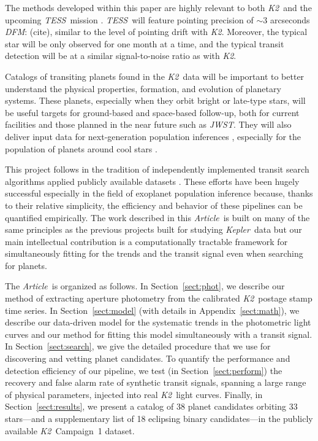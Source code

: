\documentclass[12pt,preprint]{aastex}
\newcommand{\project}[1]{\textsl{#1}} %
\newcommand{\kepler}{\project{Kepler}}
\newcommand{\KT}{\project{K2}}
\newcommand{\tess}{\project{TESS}}
\newcommand{\jwst}{\project{JWST}}
\newcommand{\paper}{\textsl{Article}}
\newcommand{\sectionname}{Section}
\newcommand{\Sect}[1]{\sectionname~\ref{sect:#1}}
\newcommand{\sect}[1]{\Sect{#1}}
\newcommand{\App}[1]{Appendix~\ref{sect:#1}}
\newcommand{\app}[1]{\App{#1}}
\newcommand{\todo}[3]{{\color{#2}\emph{#1}: #3}}
\newcommand{\dfmtodo}[1]{\todo{DFM}{red}{#1}}
\begin{document}
The methods developed within this paper are highly relevant to both \KT\ and
the upcoming \tess\ mission \citep{Ricker:2014}.
\tess\ will feature pointing precision of $\sim 3$ arcseconds
\dfmtodo{(cite)}, similar to the level of pointing drift with \KT.
Moreover, the typical star will be only observed for one month at a time, and
the typical transit detection will be at a similar signal-to-noise ratio as
with \KT.

Catalogs of transiting planets found in the \KT\ data will be important to
better understand the physical properties, formation, and evolution of
planetary systems.
These planets, especially when they orbit bright or late-type stars, will be
useful targets for ground-based and space-based follow-up, both for current
facilities and those planned in the near future such as \jwst.
They will also deliver input data for next-generation population inferences
\citep{dfm}, especially for the population of planets around cool stars
\citep[for example,][]{dressing}.

This project follows in the tradition of independently implemented transit
search algorithms applied publicly available datasets \citep[such
as][]{petigura1, petigura2, roberto, dressing}.
These efforts have been hugely successful especially in the field of exoplanet
population inference because, thanks to their relative simplicity, the
efficiency and behavior of these pipelines can be quantified empirically.
The work described in this \paper\ is built on many of the same principles as
the previous projects built for studying \kepler\ data but our main
intellectual contribution is a computationally tractable framework for
simultaneously fitting for the trends and the transit signal even when
searching for planets.

The \paper\ is organized as follows.
In \sect{phot}, we describe our method of extracting aperture photometry from
the calibrated \KT\ postage stamp time series.
In \sect{model} (with details in \app{math}), we describe our data-driven
model for the systematic trends in the photometric light curves and our method
for fitting this model simultaneously with a transit signal.
In \sect{search}, we give the detailed procedure that we use for discovering
and vetting planet candidates.
To quantify the performance and detection efficiency of our pipeline, we test
(in \sect{perform}) the recovery and false alarm rate of synthetic transit
signals, spanning a large range of physical parameters, injected into real
\KT\ light curves.
Finally, in \sect{results}, we present a catalog of 38 planet candidates
orbiting 33 stars---and a supplementary list of 18 eclipsing binary
candidates---in the publicly available \KT\ Campaign~1 dataset.
\end{document}
